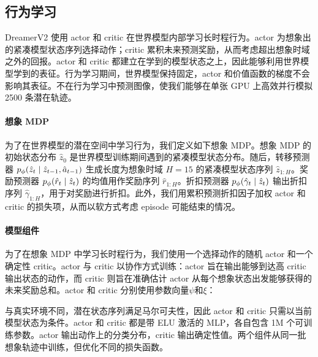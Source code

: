 \subsection{行为学习}

DreamerV2 使用 actor 和 critic 在世界模型内部学习长时程行为。actor 为想象出的紧凑模型状态序列选择动作；critic 累积未来预测奖励，从而考虑超出想象时域之外的回报。actor 和 critic 都建立在学到的模型状态之上，因此能够利用世界模型学到的表征。行为学习期间，世界模型保持固定，actor 和价值函数的梯度不会影响其表征。不在行为学习中预测图像，使我们能够在单张 GPU 上高效并行模拟 2500 条潜在轨迹。

\paragraph{想象 MDP}

为了在世界模型的潜在空间中学习行为，我们定义如下想象 MDP。想象 MDP 的初始状态分布 $\hat{z}_0$ 是世界模型训练期间遇到的紧凑模型状态分布。随后，转移预测器 $\pp(\hat{z}_t | \hat{z}_{t-1},\hat{a}_{t-1})$ 生成长度为想象时域 $H=15$ 的紧凑模型状态序列 $\hat{z}_{1:H}$。奖励预测器 $\pp(\hat{r}_t|\hat{z}_t)$ 的均值用作奖励序列 $\hat{r}_{1:H}$。折扣预测器 $\pp(\hat{\gamma}_t|\hat{z}_t)$ 输出折扣序列 $\hat{\gamma}_{1:H}$，用于对奖励进行折扣。此外，我们用累积预测折扣因子加权 actor 和 critic 的损失项，从而以软方式考虑 episode 可能结束的情况。



\paragraph{模型组件}

为了在想象 MDP 中学习长时程行为，我们使用一个选择动作的随机 actor 和一个确定性 critic。actor 与 critic 以协作方式训练：actor 旨在输出能够到达高 critic 输出状态的动作，而 critic 则旨在准确估计 actor 从每个想象状态出发能够获得的未来奖励总和。actor 和 critic 分别使用参数向量$\psi$和$\xi$：


与真实环境不同，潜在状态序列满足马尔可夫性，因此 actor 和 critic 只需以当前模型状态为条件。actor 和 critic 都是带 ELU 激活的 MLP\citep{clevert2015elu}，各自包含 1M 个可训练参数。actor 输出动作上的分类分布，critic 输出确定性值。两个组件从同一批想象轨迹中训练，但优化不同的损失函数。

